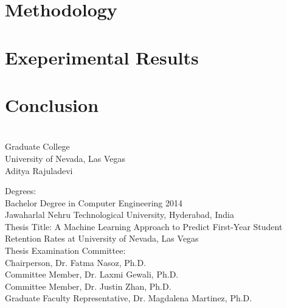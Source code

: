 \documentclass[11pt,openright]{report}
\begin{document}
\chapter{Methodology} \label{chapter:methodology}

\chapter{Exeperimental Results} \label{chapter:experiment_results}

\chapter{Conclusion} \label{chapter:conclusion}



\vita
\chapter{} %
\linespread{1.3} 
\begin{center}
Graduate College\\
University of Nevada, Las Vegas\\[1cm]
Aditya Rajuladevi\\[1cm]
\end{center}

\noindent Degrees:\\
\indent Bachelor Degree in Computer Engineering 2014\\
\indent Jawaharlal Nehru Technological University, Hyderabad, India\\

\noindent Thesis Title: A Machine Learning Approach to Predict First-Year Student Retention Rates at University of Nevada, Las Vegas\\

\noindent Thesis Examination Committee:\\
\indent Chairperson, Dr. Fatma Nasoz, Ph.D.\\
\indent Committee Member, Dr. Laxmi Gewali, Ph.D.\\
\indent Committee Member, Dr. Justin Zhan, Ph.D.\\
\indent Graduate Faculty Representative, Dr. Magdalena Martinez, Ph.D.\\
\end{document}
